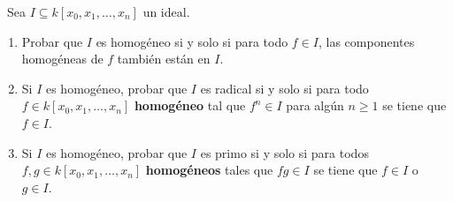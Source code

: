 \documentclass[twoside]{article}
\begin{document}
%
%
%
%
%
%
%
%
\begin{ejercicio}{1}\
Sea $I \subseteq k[x_0, x_1,\dots, x_n]$ un ideal.
\begin{enumerate}
\item Probar que $I$ es homogéneo si y solo si para todo $f \in I$, las
componentes
homogéneas de $f$ también están en $I$.
\item  Si $I$ es homogéneo, probar que $I$ es radical si y solo si para todo $f \in k[x_0, x_1,\dots, x_n]$
\textbf{homogéneo} tal que $f^n \in I$ para algún $n \geq 1$ se tiene que $f \in I$.
\item Si $I$ es homogéneo, probar que $I$ es primo si y solo si para todos $f, g \in
k[x_0, x_1,\dots, x_n]$ \textbf{homogéneos} tales que $fg \in I$ se tiene que $f \in I$ o $g \in I$.
\end{enumerate}
\end{ejercicio}
\end{document}
